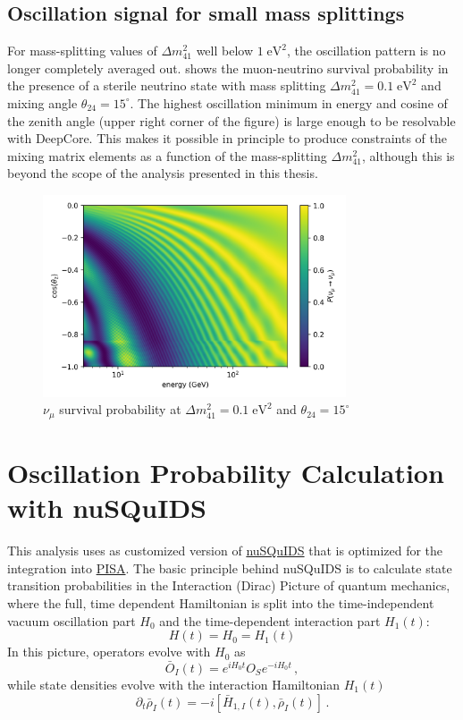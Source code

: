 \subsection{Oscillation signal for small mass splittings}
For mass-splitting values of $\Delta m^2_{41}$ well below $1\;\mathrm{eV^2}$, the oscillation pattern is no longer completely averaged out.  shows the muon-neutrino survival probability in the presence of a sterile neutrino state with mass splitting $\Delta m^2_{41}=0.1\;\mathrm{eV^2}$ and mixing angle $\theta_{24}=15^\circ$. The highest oscillation minimum in energy and cosine of the zenith angle (upper right corner of the figure) is large enough to be resolvable with DeepCore. This makes it possible in principle to produce constraints of the mixing matrix elements as a function of the mass-splitting $\Delta m^2_{41}$, although this is beyond the scope of the analysis presented in this thesis.
\begin{figure}
    \centering
    \includegraphics[width=0.8\textwidth]{figures/measurement/sterile_analysis/physics/dm41_0.1eV2_th24_15deg_avg_height_10-30km_ana_binning_range.png}
    \caption{$\nu_{\mu}$ survival probability at $\Delta m^2_{41}=0.1\;\mathrm{eV^2}$ and $\theta_{24}=15^\circ$}
    \label{fig:numu_survival_0.1eV2_analysis_binning_range}
\end{figure}

\section{Oscillation Probability Calculation with nuSQuIDS}
\label{sec:nusquids}

This analysis uses as customized version of \href{https://github.com/ts4051/nuSQuIDS}{nuSQuIDS} that is optimized for the integration into \href{https://github.com/icecube/pisa}{PISA}. The basic principle behind nuSQuIDS is to calculate state transition probabilities in the Interaction (Dirac) Picture of quantum mechanics, where the full, time dependent Hamiltonian is split into the time-independent vacuum oscillation part $H_0$ and the time-dependent interaction part $ H_1(t)$:
$$ H(t) = H_0 = H_1(t)$$
In this picture, operators evolve with $ H_0$ as
$$
\bar{O}_I(t)=e^{iH_0t}O_Se^{-iH_0t}\,,
$$
while state densities evolve with the interaction Hamiltonian $ H_1(t)$
$$
\partial_t\bar{\rho}_I(t)=-i[\bar{H}_{1, I}(t), \bar{\rho}_I(t)]\,.
$$

